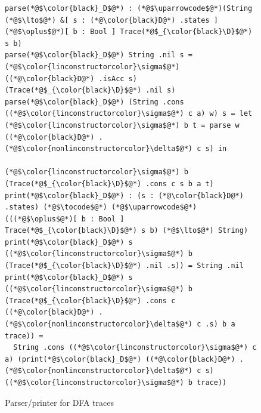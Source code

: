 \documentclass[acmsmall,nonacm]{acmart}
\newcommand{\uparrowcode}{\color{nonlinconstructorcolor} \uparrow}
\newcommand{\tocode}{\color{nonlinconstructorcolor} \to}
\newcommand{\lto}{\multimap}
\begin{document}
\begin{figure}
\begin{lstlisting}
parse(*@$\color{black}_D$@*) : (*@$\uparrowcode$@*)(String (*@$\lto$@*) &[ s : (*@\color{black}D@*) .states ] (*@$\oplus$@*)[ b : Bool ] Trace(*@$_{\color{black}\D}$@*) s b)
parse(*@$\color{black}_D$@*) String .nil s = (*@$\color{linconstructorcolor}\sigma$@*) ((*@\color{black}D@*) .isAcc s) (Trace(*@$_{\color{black}\D}$@*) .nil s)
parse(*@$\color{black}_D$@*) (String .cons ((*@$\color{linconstructorcolor}\sigma$@*) c a) w) s = let (*@$\color{linconstructorcolor}\sigma$@*) b t = parse w ((*@\color{black}D@*) .(*@$\color{nonlinconstructorcolor}\delta$@*) c s) in
                                    (*@$\color{linconstructorcolor}\sigma$@*) b (Trace(*@$_{\color{black}\D}$@*) .cons c s b a t)
print(*@$\color{black}_D$@*) : (s : (*@\color{black}D@*) .states) (*@$\tocode$@*) (*@$\uparrowcode$@*)(((*@$\oplus$@*)[ b : Bool ] Trace(*@$_{\color{black}\D}$@*) s b) (*@$\lto$@*) String)
print(*@$\color{black}_D$@*) s ((*@$\color{linconstructorcolor}\sigma$@*) b (Trace(*@$_{\color{black}\D}$@*) .nil .s)) = String .nil
print(*@$\color{black}_D$@*) s ((*@$\color{linconstructorcolor}\sigma$@*) b (Trace(*@$_{\color{black}\D}$@*) .cons c ((*@\color{black}D@*) .(*@$\color{nonlinconstructorcolor}\delta$@*) c .s) b a trace)) =
  String .cons ((*@$\color{linconstructorcolor}\sigma$@*) c a) (print(*@$\color{black}_D$@*) ((*@\color{black}D@*) .(*@$\color{nonlinconstructorcolor}\delta$@*) c s) ((*@$\color{linconstructorcolor}\sigma$@*) b trace))
\end{lstlisting}
\caption{Parser/printer for DFA traces}
\label{fig:printdfa}
\end{figure}
\end{document}

